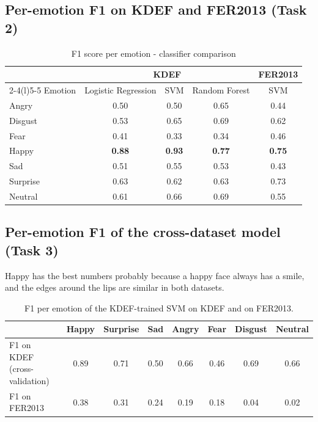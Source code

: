 \subsection{Per-emotion F1 on KDEF and FER2013 (Task 2)}
\label{app:emotion-both}
\begin{table}[H]\centering\small
\begin{tabular}{@{}lcccc@{}}\toprule
 & \multicolumn{3}{c}{KDEF} & FER2013 \\\cmidrule(lr){2-4}\cmidrule(l){5-5}
Emotion & Logistic Regression & SVM & Random Forest & SVM \\\midrule
Angry & 0.50 & 0.50 & 0.65 & 0.44 \\
Disgust & 0.53 & 0.65 & 0.69 & 0.62 \\
Fear & 0.41 & 0.33 & 0.34 & 0.46 \\
Happy & \textbf{0.88} & \textbf{0.93} & \textbf{0.77} & \textbf{0.75} \\
Sad & 0.51 & 0.55 & 0.53 & 0.43 \\
Surprise & 0.63 & 0.62 & 0.63 & 0.73 \\
Neutral & 0.61 & 0.66 & 0.69 & 0.55 \\
\bottomrule\end{tabular}
\caption{F1 score per emotion - classifier comparison }
\label{tab:emotion-both}
\end{table}

\FloatBarrier
\subsection{Per-emotion F1 of the cross-dataset model (Task 3)}
\label{app:cross-emotion}
Happy has the best numbers probably because a happy face always has a smile, and the edges around the lips are similar in both datasets.
\begin{table}[H]\centering\small
\begin{tabular}{@{}lccccccc@{}}\toprule
 & Happy & Surprise & Sad & Angry & Fear & Disgust & Neutral \\\midrule
F1 on KDEF (cross-validation) & 0.89 & 0.71 & 0.50 & 0.66 & 0.46 & 0.69 & 0.66 \\
F1 on FER2013 & 0.38 & 0.31 & 0.24 & 0.19 & 0.18 & 0.04 & 0.02 \\
\bottomrule\end{tabular}
\caption{F1 per emotion of the KDEF-trained SVM on KDEF and on FER2013.}
\label{tab:cross-emotion}
\end{table}

\FloatBarrier
